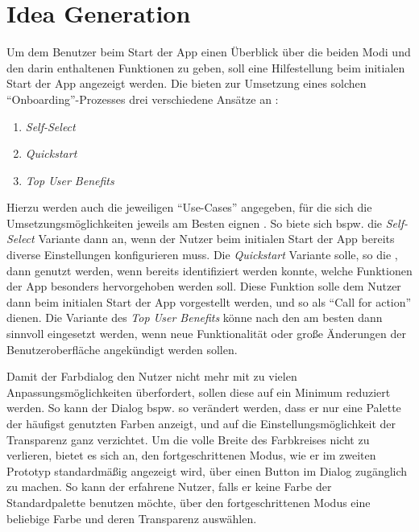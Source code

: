 \section{Idea Generation}\label{sec:idea3}
Um dem Benutzer beim Start der App einen Überblick über die beiden Modi und den darin enthaltenen Funktionen zu geben, soll eine Hilfestellung beim initialen Start der App angezeigt werden.
Die \mg{} bieten zur Umsetzung eines solchen ``Onboarding''-Prozesses drei verschiedene Ansätze an \citep{Onboarding}:

\begin{enumerate}
  \item \emph{Self-Select}
  \item \emph{Quickstart}  
  \item \emph{Top User Benefits}  
\end{enumerate}

Hierzu werden auch die jeweiligen ``Use-Cases'' angegeben, für die sich die Umsetzungsmöglichkeiten jeweils am Besten eignen \citep[Abschnitt ``Usage'']{Onboarding}.
So biete sich bspw. die \emph{Self-Select} Variante dann an, wenn der Nutzer beim initialen Start der App bereits diverse Einstellungen konfigurieren muss.
Die \emph{Quickstart} Variante solle, so die \mg{}, dann genutzt werden, wenn bereits identifiziert werden konnte, welche Funktionen der App besonders hervorgehoben werden soll.
Diese Funktion solle dem Nutzer dann beim initialen Start der App vorgestellt werden, und so als ``Call for action'' dienen.
Die Variante des \emph{Top User Benefits} könne nach den \mg{} am besten dann sinnvoll eingesetzt werden, wenn neue Funktionalität oder große Änderungen der Benutzeroberfläche angekündigt werden sollen. \\

Damit der Farbdialog den Nutzer nicht mehr mit zu vielen Anpassungsmöglichkeiten überfordert, sollen diese auf ein Minimum reduziert werden.
So kann der Dialog bspw. so verändert werden, dass er nur eine Palette der häufigst genutzten Farben anzeigt, und auf die Einstellungsmöglichkeit der Transparenz ganz verzichtet.
Um die volle Breite des Farbkreises nicht zu verlieren, bietet es sich an, den fortgeschrittenen Modus, wie er im zweiten Prototyp standardmäßig angezeigt wird, über einen Button im Dialog zugänglich zu machen.
So kann der erfahrene Nutzer, falls er keine Farbe der Standardpalette benutzen möchte, über den fortgeschrittenen Modus eine beliebige Farbe und deren Transparenz auswählen. \\

